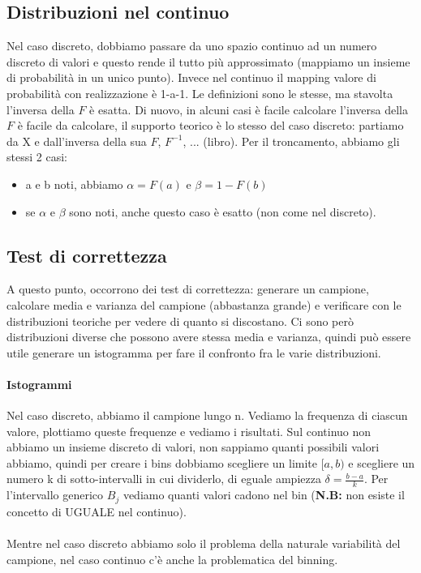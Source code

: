 \documentclass{article}
\begin{document}
\subsection{Distribuzioni nel continuo}
Nel caso discreto, dobbiamo passare da uno spazio continuo ad un numero discreto di valori e questo rende il tutto più approssimato (mappiamo un insieme di probabilità in un unico punto). Invece nel continuo il mapping valore di probabilità con realizzazione è 1-a-1. Le definizioni sono le stesse, ma stavolta l'inversa della $F$ è esatta. Di nuovo, in alcuni casi è facile calcolare l'inversa della $F$ è facile da calcolare, il supporto teorico è lo stesso del caso discreto: partiamo da X e dall'inversa della sua $F$, $F^{-1}$, ... (libro).  Per il troncamento, abbiamo gli stessi 2 casi:
\begin{itemize}
\item a e b noti, abbiamo $\alpha = F(a)$ e $\beta = 1 - F(b)$
\item se $\alpha$ e $\beta$ sono noti, anche questo caso è esatto (non come nel discreto).
\end{itemize}
\subsection{Test di correttezza}
A questo punto, occorrono dei test di correttezza: generare un campione, calcolare media e varianza del campione (abbastanza grande) e verificare con le distribuzioni teoriche per vedere di quanto si discostano. Ci sono però distribuzioni diverse che possono avere stessa media e varianza, quindi può essere utile generare un istogramma per fare il confronto fra le varie distribuzioni.
\paragraph{Istogrammi}
Nel caso discreto, abbiamo il campione lungo n. Vediamo la frequenza di ciascun valore, plottiamo queste frequenze e vediamo i risultati. Sul continuo non abbiamo un insieme discreto di valori, non sappiamo quanti possibili valori abbiamo, quindi per creare i bins dobbiamo scegliere un limite $[a, b)$ e scegliere un numero k di sotto-intervalli in cui dividerlo, di eguale ampiezza $\delta = \frac{b-a}{k}$. Per l'intervallo generico $B_j$ vediamo quanti valori cadono nel bin (\textbf{N.B: } non esiste il concetto di UGUALE nel continuo).\\\\ Mentre nel caso discreto abbiamo solo il problema della naturale variabilità  del campione, nel caso continuo c'è anche la problematica del binning.
\end{document}
